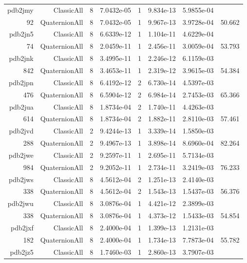 \begin{xltabular}{\textwidth}{r|rcS[table-format=1.4e+2]cS[table-format=1.3e+2]S[table-format=1.4e+2]S[table-format=-1.3]}
pdb2jmy & ClassicAll & 8 & 7.0432e-05 & 1 & 9.834e-13 & 5.9855e-04 & \\
92 & QuaternionAll & 8 & 7.0432e-05 & 1 & 9.967e-13 & 3.9728e-04 & 50.662\\  \addlinespace
pdb2jn5 & ClassicAll & 8 & 6.6339e-12 & 1 & 1.104e-11 & 4.6229e-04 & \\
74 & QuaternionAll & 8 & 2.0459e-11 & 1 & 2.456e-11 & 3.0059e-04 & 53.793\\  \addlinespace
pdb2jnk & ClassicAll & 8 & 3.4995e-11 & 1 & 2.246e-12 & 6.1159e-03 & \\
842 & QuaternionAll & 8 & 3.4653e-11 & 1 & 2.319e-12 & 3.9615e-03 & 54.384\\  \addlinespace
pdb2jpn & ClassicAll & 8 & 6.4192e-12 & 2 & 6.730e-14 & 4.5397e-03 & \\
476 & QuaternionAll & 8 & 6.5904e-12 & 2 & 6.984e-14 & 2.7453e-03 & 65.366\\  \addlinespace
pdb2jua & ClassicAll & 8 & 1.8734e-04 & 2 & 1.740e-11 & 4.4263e-03 & \\
614 & QuaternionAll & 8 & 1.8734e-04 & 2 & 1.882e-11 & 2.8110e-03 & 57.461\\  \addlinespace
pdb2jvd & ClassicAll & 2 & 9.4244e-13 & 1 & 3.339e-14 & 1.5850e-03 & \\
288 & QuaternionAll & 2 & 9.4967e-13 & 1 & 3.898e-14 & 8.6960e-04 & 82.264\\  \addlinespace
pdb2jwe & ClassicAll & 2 & 9.2597e-11 & 1 & 2.695e-11 & 5.7134e-03 & \\
984 & QuaternionAll & 2 & 9.2052e-11 & 1 & 2.734e-11 & 3.2419e-03 & 76.233\\  \addlinespace
pdb2jws & ClassicAll & 8 & 4.5612e-04 & 2 & 1.251e-13 & 2.4140e-03 & \\
338 & QuaternionAll & 8 & 4.5612e-04 & 2 & 1.543e-13 & 1.5437e-03 & 56.376\\  \addlinespace
pdb2jwu & ClassicAll & 8 & 3.0876e-04 & 1 & 4.421e-12 & 2.3899e-03 & \\
338 & QuaternionAll & 8 & 3.0876e-04 & 1 & 4.373e-12 & 1.5433e-03 & 54.854\\  \addlinespace
pdb2jxf & ClassicAll & 8 & 2.4000e-04 & 1 & 1.399e-13 & 1.2131e-03 & \\
182 & QuaternionAll & 8 & 2.4000e-04 & 1 & 1.734e-13 & 7.7873e-04 & 55.782\\  \addlinespace
pdb2jz5 & ClassicAll & 8 & 1.7460e-03 & 1 & 2.860e-13 & 3.7907e-03 & \\

\end{xltabular}
